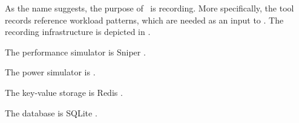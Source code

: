 

As the name suggests, the purpose of \recorder\ is recording. More specifically,
the tool records reference workload patterns, which are needed as an input to
\streamer. The recording infrastructure is depicted in .

The performance simulator is Sniper \cite{carlson2011}.

The power simulator is  \cite{li2009}.

The key-value storage is Redis \cite{redis}.

The database is SQLite \cite{sqlite}.
